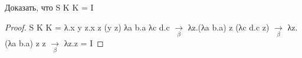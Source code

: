 \begin{problem}
Доказать, что S K K = I
\end{problem}
\begin{proof}
S K K = λ.x y z.x z (y z) λa b.a λc d.c $\underset{\beta}{\longrightarrow}$ λz.(λa b.a) z (λc d.c z) $\underset{\beta}{\longrightarrow}$
λz.(λa b.a) z z $\underset{\beta}{\longrightarrow}$ λz.z = I
\end{proof}
